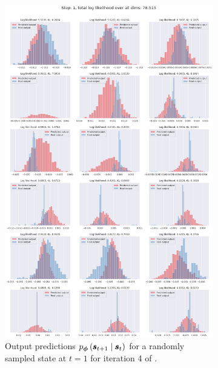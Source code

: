 \begin{figure}
\centering
\begin{subfigure}{\textwidth}
    \includegraphics[trim=0 1370 0 50,clip,width=1.0\textwidth]
    {img/windyslope/output/windyslope_output_det2stoc2_dist_10_step1_iter4.png}
    \caption{Output predictions $p_{\vph}\protect\given*{\vns}{\vs}$ for a randomly sampled state at $t=1$ for iteration 4 of \dettostoc{}.}
    \label{fig:output_distribution_step1_posvel_dettostoc}
\end{subfigure}
\begin{subfigure}{\textwidth}
    \centering

\end{subfigure}
\end{figure}
